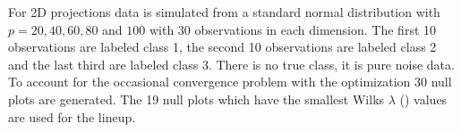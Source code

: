 \documentclass[12]{article}
\begin{document}
%
%
%
%


For 2D projections data is simulated from a standard normal distribution with $ p=20, 40, 60, 80$ and $100$ with 30 observations in each dimension. The first 10 observations are labeled class 1, the second 10 observations are labeled class 2 and the last third are labeled class 3. There is no true class, it is pure noise data. To account for the occasional convergence problem with the optimization 30 null plots are generated. The 19 null plots which have the smallest Wilks $\lambda$ (\cite{JW02}) values are used for the lineup. 
\end{document}
